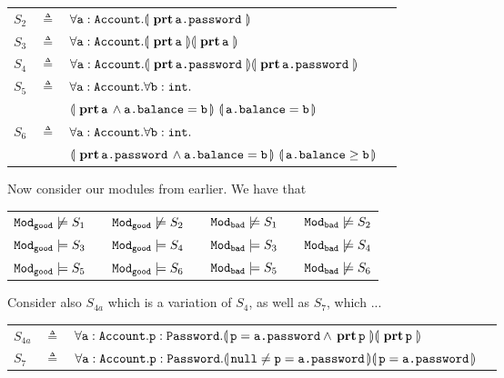 {\begin{tabular}{lcll}
 $S_2$   &     $\triangleq$   & $\OneStateQ{\prg{a}:\prg{Account} } {\inside{\prg{a.password}}} $
 \\
 $S_3$   & $\triangleq$   &  $\TwoStatesQ {\prg{a}:\prg{Account}}  {\inside{\prg{a}}} {\inside{\prg{a}}} $
 \\
 $S_4$   & $\triangleq$   &  $\TwoStatesQ {\prg{a}:\prg{Account}}  {\inside{\prg{a.password}}} {\inside{\prg{a.password}}}$
 \\
$S_5$ & $\triangleq$   &
 $\forall \prg{a}:\prg{Account}.\forall \prg{b}:\prg{int}.$\\
  &  &  $\FirstState{\inside{\prg{a}} \wedge \prg{a.balance}=\prg{b}} 
\  \SecondState{ \prg{a.balance}= \prg{b} }$
\\
$S_6$ & $\triangleq$   &
  $\forall \prg{a}:\prg{Account}.\forall \prg{b}:\prg{int}.$\\
  &  &  $\FirstState{\inside{\prg{a.password}} \wedge \prg{a.balance}=\prg{b}} 
\  \SecondState{ \prg{a.balance}\geq \prg{b} }$
 \end{tabular}

\vspace{.2cm}
Now consider our modules from earlier. We have that

\begin{tabular}{lllllll}
$\ModA \not\models S_1$  & & $\ModA \not\models S_2$ &&  $\ModB \not\models S_1$ &  &$\ModB \not\models S_2$ \\
$\ModA \models S_3$ & &   $\ModA \models S_4$ & &  $\ModB  \models S_3$ & &  $\ModB  \not\models S_4$ \\
$\ModA \models S_5$ & &  $\ModA \models S_6$ & & $\ModB  \models S_5$ & & $\ModB   \not\models S_6$ \\
\end{tabular}

\vspace{.6cm}
Consider also  $S_{4a}$ which is a variation of $S_4$, as well as $S_7$, which ...

\begin{tabular}{lcll}
$S_{4a}$   &     $\triangleq$   &   ${\TwoStatesQ {\prg{a}:\prg{Account}.\prg{p}:\prg{Password}}  {\prg{p}=\prg{a.password} \wedge \inside{\prg{p}}}{\inside{\prg{p}}} }$
 \\
$S_7$ & $\triangleq$   & ${\TwoStatesQ {\prg{a}:\prg{Account}.\prg{p}:\prg{Password}}  {\prg{null}\neq \prg{p}=\prg{a.password}} {\prg{p}=\prg{a.password}} }$
 \end{tabular}
 
}
